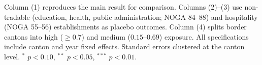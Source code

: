 \begin{table}[htbp]
   \par \raggedright
   Column (1) reproduces the main result for comparison. Columns (2)--(3) use non-tradable (education, health, public administration; NOGA 84--88) and hospitality (NOGA 55--56) establishments as placebo outcomes. Column (4) splits border cantons into high ($\geq 0.7$) and medium ($0.15$--$0.69$) exposure. All specifications include canton and year fixed effects. Standard errors clustered at the canton level. $^{*}$ $p<0.10$, $^{**}$ $p<0.05$, $^{***}$ $p<0.01$.
\end{table}


